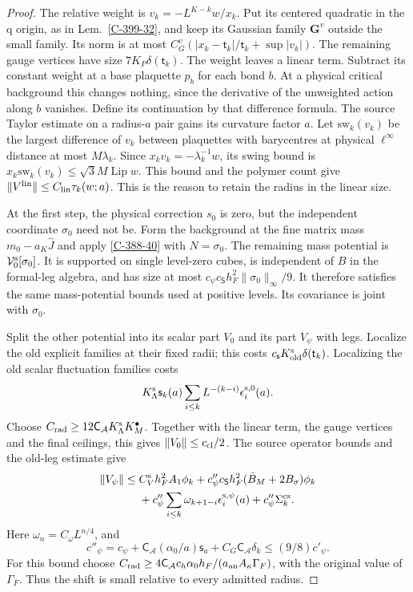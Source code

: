 \documentclass[11pt,letterpaper,reqno]{amsart}
\theoremstyle{definition}
\theoremstyle{remark}
\begin{document}
\begin{proof}
The relative weight is $v_k=-L^{K-k}w/x_k$.
Put its centered quadratic in the q origin, as in
Lem.~\ref{C-399-32}, and keep its Gaussian family
$\mathbf G^v$ outside the small family. Its norm is at most
$C_G^v(|x_k-\mathsf t_k|/\mathsf t_k+\sup|v_k|)$.
The remaining gauge vertices have size
$7K_P\delta(\mathsf t_k)$.
The weight leaves a linear term. Subtract its constant
weight at a base plaquette $p_b$ for each bond $b$.
At a physical critical background this changes nothing,
since the derivative of the unweighted action along $b$
vanishes. Define its continuation by that difference
formula. The source Taylor estimate on a radius-$a$ pair
gains its curvature factor $a$. Let $\mathrm{sw}_k(v_k)$ be the
largest difference of $v_k$ between plaquettes with barycentres
at physical $\ell^\infty$ distance at most $M\lambda_k$.
Since $x_kv_k=-\lambda_k^{-1}w$, its swing bound is
$x_k\mathrm{sw}_k(v_k)\le\sqrt3M\operatorname{Lip}w$.
This bound and the polymer count give
$\|V^{\rm lin}\|\le C_{\rm lin}\tau_k(w;a)$.
This is the reason to retain the radius in the linear size.

At the first step, the physical correction $s_0$ is zero,
but the independent coordinate $\sigma_0$ need not be.  Form the
background at the fine matrix mass $m_0-a_K\widehat J$ and apply
\cref{C-388-40} with $N=\sigma_0$.  The remaining mass potential
is $\mathcal V^{\rm s}_0[\sigma_0]$.  It is supported on single
level-zero cubes, is independent of $B$ in the formal-leg
algebra, and has size at most
$c_\psi c_{\mathsf S}h_F^2\|\sigma_0\|_\infty/9$.
It therefore satisfies the same mass-potential bounds used at
positive levels.  Its covariance is joint with $\sigma_0$.

Split the other potential into its scalar part $V_0$ and
its part $V_\psi$ with legs. Localize the old explicit
families at their fixed radii; this costs
$c_{\mathsf s}K_{\rm old}^{\rm s}\delta(\mathsf t_k)$.
Localizing the old scalar fluctuation families costs
\[
 K_\Lambda^{\rm s}\mathsf s_k(a)
 \sum_{i\le k}L^{-(k-i)}\epsilon_i^{{\rm s},0}(a).
\]
Choose $C_{\rm rad}\ge12\mathsf C_{\mathcal A}K_\Lambda^{\rm s}K_M^\bullet$.
Together with the linear term, the gauge vertices and the
final ceilings, this gives $\|V_0\|\le c_{\rm cl}/2$.
The source operator bounds and the old-leg estimate give
\begin{equation}\label{eq:qcd-source-leg-input}
\begin{split}
 \|V_\psi\|\le{}&C_V^{\rm s}h_F^2A_1\phi_k
 +c''_\psi c_{\mathsf S}h_F^2(\bar B_M+2B_\sigma)\phi_k\\
 &+c''_\psi\sum_{i\le k}\omega_{k+1-i}
                           \epsilon_i^{{\rm s},\psi}(a)
 +c''_\psi\Sigma_k^{\rm cs}.
\end{split}
\end{equation}
Here $\omega_n=C_\omega L^{n/4}$, and
\[
 c''_\psi=c_\psi+\mathsf C_{\mathcal A}(\alpha_0/a)\mathsf s_a
       +C_G\mathsf C_{\mathcal A}\delta_k\le(9/8)c'_\psi.
\]
For this bound choose
$C_{\rm rad}\ge4\mathsf C_{\mathcal A}c_h\alpha_0h_F/(a_{\rm an}A_\kappa\Gamma_F)$,
with the original value of $\Gamma_F$.
Thus the shift is small relative to every admitted radius.


\end{proof}
\end{document}
